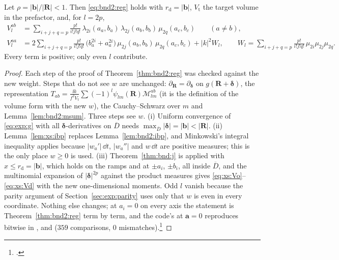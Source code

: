 \begin{theorem}
\label{thm:xs:reg}
Let $\rho = |\mathbf{b}|/|\mathbf{R}|<1$. Then \eqref{eq:bnd2:reg} holds with
$r_{\mathrm{d}} = |\mathbf{b}|$, $V_{\mathrm{t}}$ the target volume in the prefactor, and,
for $l = 2p$,
\begin{align}
V^{ab}_l &= \sum_{i+j+q=p}\tfrac{p!}{i!j!q!}\,\lambda_{2i}(a_a,b_a)\,\lambda_{2j}(a_b,b_b)\,\mu_{2q}(a_c,b_c)
\qquad (a\ne b),\label{eq:xs:Vo}\\
V^{aa}_l &= 2\sum_{i+j+q=p}\tfrac{p!}{i!j!q!}\,\bigl(b_a^{2i}+a_a^{2i}\bigr)\,\mu_{2j}(a_b,b_b)\,\mu_{2q}(a_c,b_c)
+ |k|^2W_l,\qquad W_l = \sum_{i+j+q=p}\tfrac{p!}{i!j!q!}\,\mu_{2i}\mu_{2j}\mu_{2q}.
\label{eq:xs:Vd}
\end{align}
Every term is positive; only even $l$ contribute.
\end{theorem}
\begin{proof}
Each step of the proof of Theorem~\ref{thm:bnd2:reg} was checked against the new weight.
Steps that do not see $w$ are unchanged: $\partial_{\mathbf{R}} = \partial_{\boldsymbol{\delta}}$
on $g(\mathbf{R}+\boldsymbol{\delta})$, the representation
$T_{ab} = \frac{\ii k}{f^2V_{\mathrm{t}}}\sum(-1)^l\psi_{lm}(\mathbf{R})\mathcal{M}^{ab}_{lm}$
(it is the definition of the volume form with the new $w$), the Cauchy--Schwarz over $m$
and Lemma~\ref{lem:bnd2:msum}. Three steps see $w$. (i) Uniform convergence of
\eqref{eq:exp:g} with all $\boldsymbol{\delta}$-derivatives on $\overline D$ needs
$\max_{\overline D}|\boldsymbol{\delta}| = |\mathbf{b}| < |\mathbf{R}|$. (ii)
Lemma~\ref{lem:xs:ibp} replaces Lemma~\ref{lem:bnd2:ibp}, and Minkowski's integral
inequality applies because $|w_a'|\,\dd t$, $|w_a''|$ and $w\,\dd t$ are positive measures;
this is the only place $w\ge0$ is used. (iii) Theorem~\ref{thm:bnd:j} is applied with
$x\le r_{\mathrm{d}} = |\mathbf{b}|$, which holds on the ramps and at $\pm a_i$, $\pm b_i$,
all inside $\overline D$, and the multinomial expansion of $|\boldsymbol{\delta}|^{2p}$
against the product measures gives \eqref{eq:xs:Vo}--\eqref{eq:xs:Vd} with the new
one-dimensional moments. Odd $l$ vanish because the parity argument of
Section~\ref{sec:exp:parity} uses only that $w$ is even in every coordinate. Nothing else
changes; at $a_i = 0$ on every axis the statement is Theorem~\ref{thm:bnd2:reg} term by
term, and the code's  at $\mathbf{a} = 0$ reproduces
 bitwise in ,  and
 ($359$ comparisons, $0$ mismatches).\footnote{.}
\end{proof}

